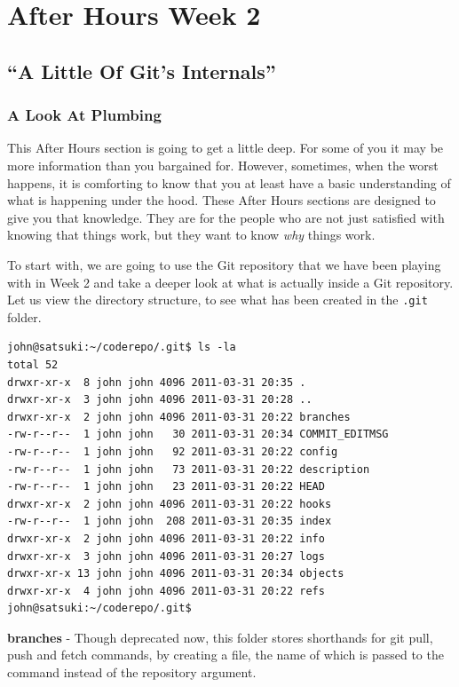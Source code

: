 \chapter{After Hours Week 2}
\section{``A Little Of Git's Internals''}
\subsection{A Look At Plumbing}
This After Hours section is going to get a little deep.  For some of you it may be more information than you bargained for.  However, sometimes, when the worst happens, it is comforting to know that you at least have a basic understanding of what is happening under the hood.  These After Hours sections are designed to give you that knowledge.  They are for the people who are not just satisfied with knowing that things work, but they want to know \emph{why} things work.

To start with, we are going to use the Git repository that we have been playing with in Week 2 and take a deeper look at what is actually inside a Git repository.  Let us view the directory structure, to see what has been created in the \texttt{.git} folder.

\begin{Verbatim}
john@satsuki:~/coderepo/.git$ ls -la
total 52
drwxr-xr-x  8 john john 4096 2011-03-31 20:35 .
drwxr-xr-x  3 john john 4096 2011-03-31 20:28 ..
drwxr-xr-x  2 john john 4096 2011-03-31 20:22 branches
-rw-r--r--  1 john john   30 2011-03-31 20:34 COMMIT_EDITMSG
-rw-r--r--  1 john john   92 2011-03-31 20:22 config
-rw-r--r--  1 john john   73 2011-03-31 20:22 description
-rw-r--r--  1 john john   23 2011-03-31 20:22 HEAD
drwxr-xr-x  2 john john 4096 2011-03-31 20:22 hooks
-rw-r--r--  1 john john  208 2011-03-31 20:35 index
drwxr-xr-x  2 john john 4096 2011-03-31 20:22 info
drwxr-xr-x  3 john john 4096 2011-03-31 20:27 logs
drwxr-xr-x 13 john john 4096 2011-03-31 20:34 objects
drwxr-xr-x  4 john john 4096 2011-03-31 20:22 refs
john@satsuki:~/coderepo/.git$
\end{Verbatim}

\textbf{branches} - Though deprecated now, this folder stores shorthands for git pull, push and fetch commands, by creating a file, the name of which is passed to the command instead of the repository argument.

